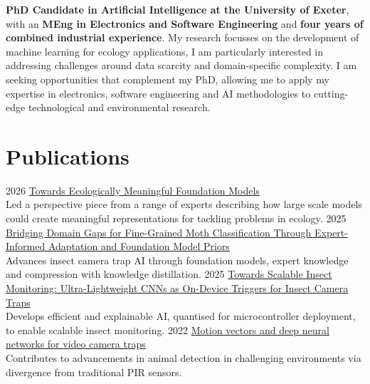 \documentclass[a4paper]{cv-style}     %
\begin{document}
\textbf{PhD Candidate in Artificial Intelligence at the University of Exeter}, with an \textbf{MEng in Electronics and Software Engineering} and \textbf{four years of combined industrial experience}. My research focusses on the development of machine learning for ecology applications, I am particularly interested in addressing challenges around data scarcity and domain-specific complexity. I am seeking opportunities that complement my PhD, allowing me to apply my expertise in electronics, software engineering and AI methodologies to cutting-edge technological and environmental research.
  \vspace{-0.3cm}
\section{Publications}
  \vspace{-0.3cm}
\begin{entrylist}
\entry
{2026}
{\href{}{Towards Ecologically Meaningful Foundation Models}}
{}
{ \\ Led a perspective piece from a range of experts describing how large scale models could create meaningful representations for tackling problems in ecology. }
\entry
{2025}
{\href{https://openaccess.thecvf.com/content/ICCV2025W/CV4E/html/Gardiner_Bridging_Domain_Gaps_for_Fine-Grained_Moth_Classification_Through_Expert-Informed_Adaptation_ICCVW_2025_paper.html}{Bridging Domain Gaps for Fine-Grained Moth Classification Through Expert-Informed Adaptation and Foundation Model Priors}}
{}
{ \\ Advances insect camera trap AI through foundation models, expert knowledge and compression with knowledge distillation.}
\entry
{2025}
{\href{https://besjournals.onlinelibrary.wiley.com/doi/10.1111/2041-210X.70098}{Towards Scalable Insect Monitoring: Ultra-Lightweight CNNs as On-Device Triggers for Insect Camera Traps}}
{}
{ \\ Develops efficient and explainable AI, quantised for microcontroller deployment, to enable scalable insect monitoring. }
  \entry
    {2022}
    {\href{https://doi.org/10.1016/j.ecoinf.2022.101657}{Motion vectors and deep neural networks for video camera traps}}
    {}
    {\\ Contributes to advancements in animal detection in challenging environments via divergence from traditional PIR sensors.}
    \end{entrylist}
  \vspace{-0.3cm}
\end{document}
